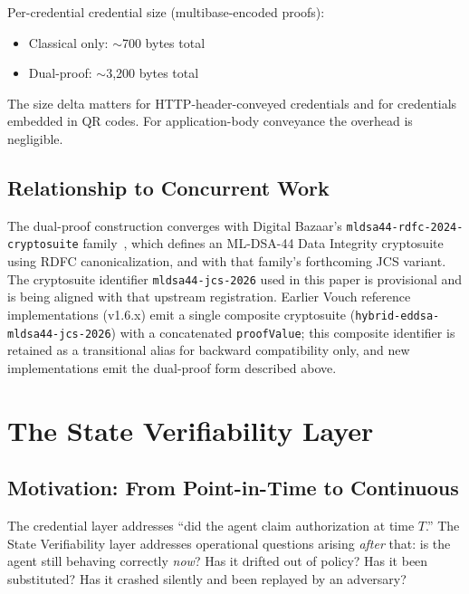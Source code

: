 \documentclass[11pt,a4paper,twocolumn]{article}
\begin{document}
Per-credential credential size (multibase-encoded proofs):

\begin{itemize}[leftmargin=*]
\item Classical only: $\sim$700 bytes total
\item Dual-proof: $\sim$3{,}200 bytes total
\end{itemize}

The size delta matters for HTTP-header-conveyed credentials and for credentials embedded in QR codes. For application-body conveyance the overhead is negligible.

\subsection{Relationship to Concurrent Work}

The dual-proof construction converges with Digital Bazaar's \texttt{mldsa44-rdfc-2024-cryptosuite} family~\cite{db-mldsa44}, which defines an ML-DSA-44 Data Integrity cryptosuite using RDFC canonicalization, and with that family's forthcoming JCS variant. The cryptosuite identifier \texttt{mldsa44-jcs-2026} used in this paper is provisional and is being aligned with that upstream registration. Earlier Vouch reference implementations (v1.6.x) emit a single composite cryptosuite (\texttt{hybrid-eddsa-mldsa44-jcs-2026}) with a concatenated \verb|proofValue|; this composite identifier is retained as a transitional alias for backward compatibility only, and new implementations emit the dual-proof form described above.

\section{The State Verifiability Layer}
\label{sec:state}

\subsection{Motivation: From Point-in-Time to Continuous}

The credential layer addresses ``did the agent claim authorization at time $T$.'' The State Verifiability layer addresses operational questions arising \emph{after} that: is the agent still behaving correctly \emph{now}? Has it drifted out of policy? Has it been substituted? Has it crashed silently and been replayed by an adversary?
\end{document}
